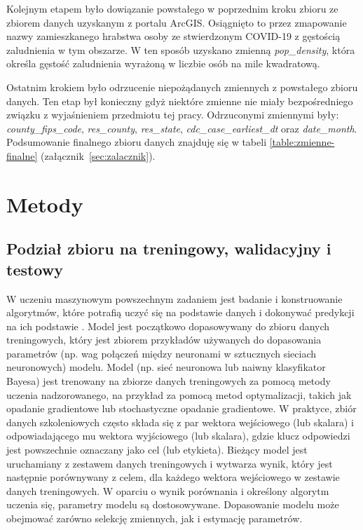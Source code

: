 \documentclass[polish, twoside, 12pt, a4paper]{article}
\theoremstyle{definition}
\theoremstyle{plain}
\theoremstyle{remark}
\begin{document}
Kolejnym etapem było dowiązanie powstałego w poprzednim kroku zbioru ze zbiorem danych uzyskanym z portalu ArcGIS. Osiągnięto to przez zmapowanie nazwy zamieszkanego hrabstwa osoby ze stwierdzonym COVID-19 z gęstością zaludnienia w tym obszarze. W ten sposób uzyskano zmienną \emph{pop\_density}, która określa gęstość zaludnienia wyrażoną w liczbie osób na mile kwadratową.

Ostatnim krokiem było odrzucenie niepożądanych zmiennych z powstałego zbioru danych. Ten etap był konieczny gdyż niektóre zmienne nie miały bezpośredniego związku z wyjaśnieniem przedmiotu tej pracy. Odrzuconymi zmiennymi były:  \emph{county\_fips\_code},  \emph{res\_county}, \emph{res\_state}, \emph{cdc\_case\_earliest\_dt} oraz \emph{date\_month}. Podsumowanie finalnego zbioru danych znajduję się w tabeli \ref{table:zmienne-finalne} (załącznik~\ref{sec:zalacznik}).


\clearpage
\section{Metody}



\subsection{Podział zbioru na treningowy, walidacyjny i testowy}
\label{chapter:train-test-split}
W uczeniu maszynowym powszechnym zadaniem jest badanie i konstruowanie algorytmów, które potrafią uczyć się na podstawie danych i dokonywać predykcji na ich podstawie \citep{kohavi1998}. Model jest początkowo dopasowywany do zbioru danych treningowych, który jest zbiorem przykładów używanych do dopasowania parametrów (np. wag połączeń między neuronami w sztucznych sieciach neuronowych) modelu. Model (np. sieć neuronowa lub naiwny klasyfikator Bayesa) jest trenowany na zbiorze danych treningowych za pomocą metody uczenia nadzorowanego, na przykład za pomocą metod optymalizacji, takich jak opadanie gradientowe lub stochastyczne opadanie gradientowe. W praktyce, zbiór danych szkoleniowych często składa się z par wektora wejściowego (lub skalara) i odpowiadającego mu wektora wyjściowego (lub skalara), gdzie klucz odpowiedzi jest powszechnie oznaczany jako cel (lub etykieta). Bieżący model jest uruchamiany z zestawem danych treningowych i wytwarza wynik, który jest następnie porównywany z celem, dla każdego wektora wejściowego w zestawie danych treningowych. W oparciu o wynik porównania i określony algorytm uczenia się, parametry modelu są dostosowywane. Dopasowanie modelu może obejmować zarówno selekcję zmiennych, jak i estymację parametrów.
\end{document}
